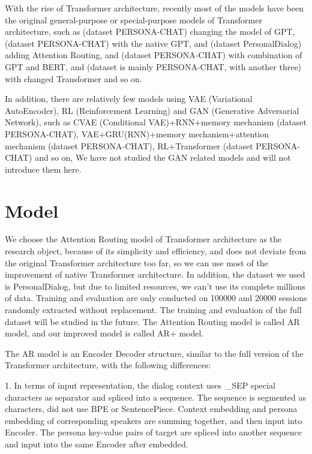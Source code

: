 \documentclass[letterpaper]{article} %
\DeclareRobustCommand{\citeext}[1]{\cite[#1]{#1}}
\begin{document}
With the rise of Transformer architecture, recently most of the models have been the original general-purpose or special-purpose models of Transformer architecture, such as\citeext{Tselousov2018} (dataset PERSONA-CHAT) changing the model of GPT\citeext{Radford2018}, \citeext{Wolf2019} (dataset PERSONA-CHAT) with the native GPT, and \citeext{Zheng2019} (dataset PersonalDialog) adding Attention Routing, and \citeext{Liu2020} (dataset PERSONA-CHAT) with combination of GPT and BERT, and \citeext{Roller2020} (dataset is mainly PERSONA-CHAT, with another three) with changed Transformer and so on. 

In addition, there are relatively few models using VAE (Variational AutoEncoder), RL (Reinforcement Learning) and GAN (Generative Adversarial Network), such as CVAE (Conditional VAE)+RNN+memory mechanism\citeext{Song2019} (dataset PERSONA-CHAT), VAE+GRU(RNN)+memory mechanism+attention mechanism\citeext{Xu2020} (dataset PERSONA-CHAT), RL+Transformer\citeext{Liu2020} (dataset PERSONA-CHAT) and so on, We have not studied the GAN related models and will not introduce them here. 

\section[Model]{Model} 

We choose the Attention Routing model of Transformer architecture\citeext{Zheng2019} as the research object, because of its simplicity and efficiency, and does not deviate from the original Transformer architecture too far, so we can use most of the improvement of native Transformer architecture. In addition, the dataset we used is PersonalDialog, but due to limited resources, we can't use its complete millions of data. Training and evaluation are only conducted on 100000 and 20000 sessions randomly extracted without replacement. The training and evaluation of the full dataset will be studied in the future. The Attention Routing model is called AR model, and our improved model is called AR+ model. 

The AR model is an Encoder Decoder structure, similar to the full version of the Transformer architecture\citeext{Vaswani2017}, with the following differences: 

1. In terms of input representation, the dialog context uses~\_SEP special characters as separator and spliced into a sequence. The sequence is segmented as characters, did not use BPE or SentencePiece. Context embedding and persona embedding of corresponding speakers are summing together, and then input into Encoder. The persona key-value pairs of target are spliced into another sequence and input into the same Encoder after embedded. 
\end{document}
